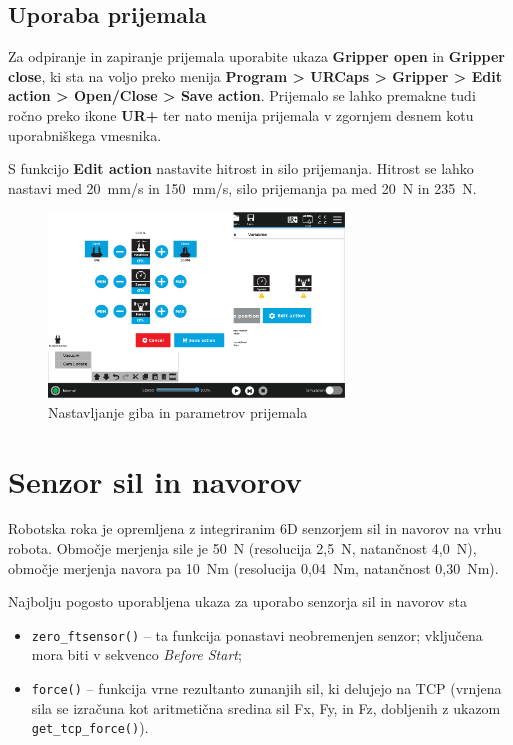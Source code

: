 \subsection{Uporaba prijemala}

Za odpiranje in zapiranje prijemala uporabite ukaza \textbf{Gripper open} in \textbf{Gripper close}, ki sta na voljo preko menija \textbf{Program > URCaps > Gripper > Edit action > Open/Close > Save action}. Prijemalo se lahko premakne tudi ročno preko ikone \textbf{UR+} ter nato menija prijemala v zgornjem desnem kotu uporabniškega vmesnika.

S funkcijo \textbf{Edit action} nastavite hitrost in silo prijemanja. Hitrost se lahko nastavi med 20~mm/s in 150~mm/s, silo prijemanja pa med 20~N in 235~N.

\begin{figure}[!hbt]
\centering
\includegraphics[width=0.7\textwidth]{ur5e_urcap_grip.eps}
\caption{Nastavljanje giba in parametrov prijemala}
\label{fig:ur_gripper1}
\end{figure}


\section{Senzor sil in navorov}

Robotska roka je opremljena z integriranim 6D senzorjem sil in navorov na vrhu robota. Območje merjenja sile je 50~N (resolucija 2,5~N, natančnost 4,0~N), območje merjenja navora pa 10~Nm (resolucija 0,04~Nm, natančnost 0,30~Nm).

Najbolju pogosto uporabljena ukaza za uporabo senzorja sil in navorov sta
\begin{itemize}
  \item \verb"zero_ftsensor()" -- ta funkcija ponastavi neobremenjen senzor; vključena mora biti v sekvenco \emph{Before Start};
  \item \verb"force()" -- funkcija vrne rezultanto zunanjih sil, ki delujejo na TCP (vrnjena sila se izračuna kot aritmetična sredina sil Fx, Fy, in Fz, dobljenih z ukazom \verb"get_tcp_force()").
\end{itemize}

